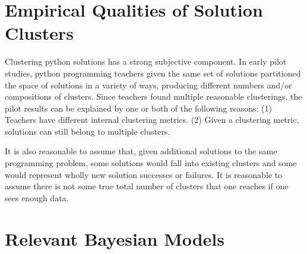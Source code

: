 \section{Empirical Qualities of Solution Clusters}

Clustering python solutions has a strong subjective component. In early pilot studies, python programming teachers given the same set of solutions partitioned the space of solutions in a variety of ways, producing different numbers and/or compositions of clusters. Since teachers found multiple reasonable clusterings, the pilot results can be explained by one or both of the following reasons: (1) Teachers have different internal clustering metrics. (2) Given a clustering metric, solutions can still belong to multiple clusters.

It is also reasonable to assume that, given additional solutions to the same programming problem, some solutions would fall into existing clusters and some would represent wholly new solution successes or failures. It is reasonable to assume there is not some true total number of clusters that one reaches if one sees enough data.

\section{Relevant Bayesian Models}

